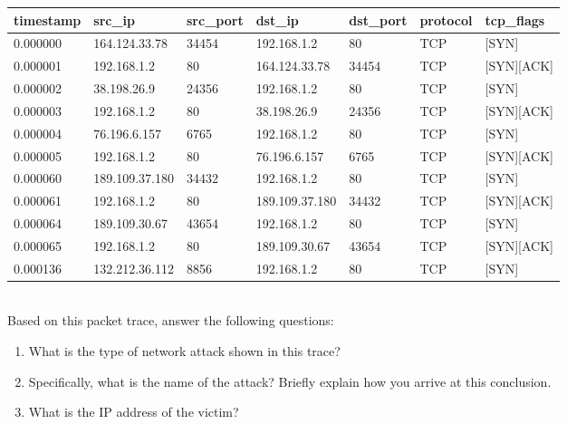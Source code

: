 \documentclass[addpoints]{exam}
\begin{document}
\begin{questions}
\begin{parts}
\begin{tabular}{|l|l|l|l|l|l|l|}
\hline
\textbf{timestamp} & \textbf{src\_ip} & \textbf{src\_port} & \textbf{dst\_ip} & \textbf{dst\_port} & \textbf{protocol} & \textbf{tcp\_flags}      \\ \hline
0.000000           & 164.124.33.78    & 34454              & 192.168.1.2      & 80                 & TCP               & {[}SYN{]}          \\ \hline
0.000001           & 192.168.1.2      & 80                 & 164.124.33.78    & 34454              & TCP               & {[}SYN{]}{[}ACK{]} \\ \hline
0.000002           & 38.198.26.9      & 24356              & 192.168.1.2      & 80                 & TCP               & {[}SYN{]}          \\ \hline
0.000003           & 192.168.1.2      & 80                 & 38.198.26.9    & 24356              & TCP               & {[}SYN{]}{[}ACK{]} \\ \hline
0.000004           & 76.196.6.157     & 6765               & 192.168.1.2      & 80                 & TCP               & {[}SYN{]}          \\ \hline
0.000005           & 192.168.1.2      & 80                 & 76.196.6.157    & 6765              & TCP               & {[}SYN{]}{[}ACK{]} \\ \hline
0.000060           & 189.109.37.180   & 34432              & 192.168.1.2      & 80                 & TCP               & {[}SYN{]}          \\ \hline
0.000061           & 192.168.1.2      & 80                 & 189.109.37.180    & 34432              & TCP               & {[}SYN{]}{[}ACK{]} \\ \hline
0.000064           & 189.109.30.67    & 43654              & 192.168.1.2      & 80                 & TCP               & {[}SYN{]}          \\ \hline
0.000065           & 192.168.1.2      & 80                 & 189.109.30.67    & 43654              & TCP               & {[}SYN{]}{[}ACK{]} \\ \hline
0.000136           & 132.212.36.112   & 8856               & 192.168.1.2      & 80                 & TCP               & {[}SYN{]}          \\ \hline
\end{tabular} \\

Based on this packet trace, answer the following questions:
\begin{enumerate}
\item What is the type of network attack shown in this trace?  
\item Specifically, what is the name of the attack? Briefly explain how you arrive at this conclusion.
\item What is the IP address of the victim?
\end{enumerate}


\end{parts}
\end{questions}
\end{document}

